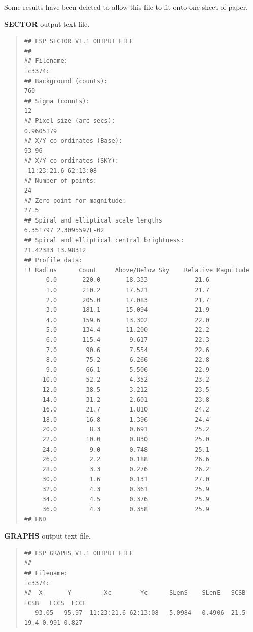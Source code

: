 \documentclass[twoside,11pt]{article}
\newenvironment{myquote}{\begin{quote}\begin{small}}{\end{small}\end{quote}}
\begin{document}
Some results have been deleted to allow this file to fit onto
one sheet of paper.

\newpage
\textbf{SECTOR} output text file.

\begin{myquote}
\begin{verbatim}
## ESP SECTOR V1.1 OUTPUT FILE
##
## Filename:
ic3374c
## Background (counts):
760
## Sigma (counts):
12
## Pixel size (arc secs):
0.9605179
## X/Y co-ordinates (Base):
93 96
## X/Y co-ordinates (SKY):
-11:23:21.6 62:13:08
## Number of points:
24
## Zero point for magnitude:
27.5
## Spiral and elliptical scale lengths
6.351797 2.3095597E-02
## Spiral and elliptical central brightness:
21.42383 13.98312
## Profile data:
!! Radius      Count     Above/Below Sky    Relative Magnitude
      0.0       220.0       18.333             21.6
      1.0       210.2       17.521             21.7
      2.0       205.0       17.083             21.7
      3.0       181.1       15.094             21.9
      4.0       159.6       13.302             22.0
      5.0       134.4       11.200             22.2
      6.0       115.4        9.617             22.3
      7.0        90.6        7.554             22.6
      8.0        75.2        6.266             22.8
      9.0        66.1        5.506             22.9
     10.0        52.2        4.352             23.2
     12.0        38.5        3.212             23.5
     14.0        31.2        2.601             23.8
     16.0        21.7        1.810             24.2
     18.0        16.8        1.396             24.4
     20.0         8.3        0.691             25.2
     22.0        10.0        0.830             25.0
     24.0         9.0        0.748             25.1
     26.0         2.2        0.188             26.6
     28.0         3.3        0.276             26.2
     30.0         1.6        0.131             27.0
     32.0         4.3        0.361             25.9
     34.0         4.5        0.376             25.9
     36.0         4.3        0.358             25.9
## END
\end{verbatim}
\end{myquote}

\newpage
\textbf{GRAPHS} output text file.

\begin{myquote}
\begin{verbatim}
## ESP GRAPHS V1.1 OUTPUT FILE
##
## Filename:
ic3374c
##  X       Y         Xc        Yc      SLenS    SLenE   SCSB  ECSB   LCCS  LCCE
   93.05   95.97 -11:23:21.6 62:13:08   5.0984   0.4906  21.5  19.4 0.991 0.827
\end{verbatim}
\end{myquote}
\end{document}
